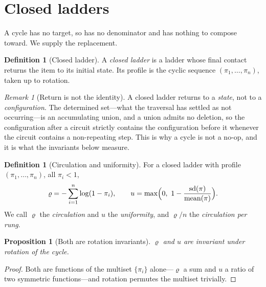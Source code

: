 \documentclass[11pt,a4paper]{article}
\theoremstyle{clthm}
\newtheorem{proposition}[theorem]{Proposition}
\theoremstyle{definition}
\newtheorem{definition}[theorem]{Definition}
\theoremstyle{remark}
\newtheorem{remark}[theorem]{Remark}
\newcommand{\pow}{\pi}
\newcommand{\circu}{\varrho}
\newcommand{\unif}{u}
\begin{document}
\section{Closed ladders}
\label{sec:closed}

A cycle has no target, so  has no denominator and
 has nothing to compose toward. We supply the replacement.

\begin{definition}[Closed ladder]
\label{def:closed}
A \emph{closed ladder} is a ladder whose final contact returns the item to
its initial state. Its profile is the cyclic sequence
$(\pow_1,\dots,\pow_n)$, taken up to rotation.
\end{definition}

\begin{remark}[Return is not the identity]
\label{rem:return}
A closed ladder returns to a \emph{state}, not to a \emph{configuration}.
The determined set---what the traversal has settled as not occurring---is
an accumulating union, and a union admits no deletion, so the
configuration after a circuit strictly contains the configuration before
it whenever the circuit contains a non-repeating step. This is why a cycle
is not a no-op, and it is what the invariants below measure.
\end{remark}

\begin{definition}[Circulation and uniformity]
\label{def:invariants}
For a closed ladder with profile $(\pow_1,\dots,\pow_n)$, all $\pow_i<1$,
\begin{equation}
\circu=-\sum_{i=1}^{n}\log(1-\pow_i),
\qquad
\unif=\max\Bigl(0,\ 1-\frac{\operatorname{sd}(\pow)}{\operatorname{mean}(\pow)}\Bigr).
\label{eq:invariants}
\end{equation}
We call $\circu$ the \emph{circulation} and $\unif$ the
\emph{uniformity}, and $\circu/n$ the \emph{circulation per rung}.
\end{definition}

\begin{proposition}[Both are rotation invariants]
\label{prop:rotinv}
$\circu$ and $\unif$ are invariant under rotation of the cycle.
\end{proposition}

\begin{proof}
Both are functions of the multiset $\{\pow_i\}$ alone---$\circu$ a sum and
$\unif$ a ratio of two symmetric functions---and rotation permutes the
multiset trivially.
\end{proof}
\end{document}
